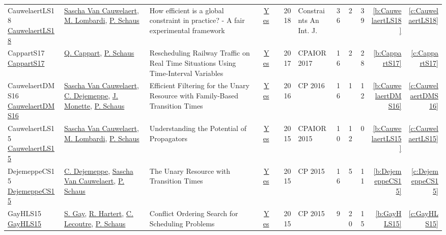{\begin{longtable}{>{\raggedright\arraybackslash}p{3cm}>{\raggedright\arraybackslash}p{6cm}>{\raggedright\arraybackslash}p{6.5cm}rrrp{2.5cm}rrrrr}
CauwelaertLS18 \href{https://doi.org/10.1007/s10601-017-9277-y}{CauwelaertLS18} & \hyperref[auth:a206]{Sascha Van Cauwelaert}, \hyperref[auth:a143]{M. Lombardi}, \hyperref[auth:a148]{P. Schaus} & How efficient is a global constraint in practice? - {A} fair experimental framework & \href{../works/CauwelaertLS18.pdf}{Yes} & \cite{CauwelaertLS18} & 2018 & Constraints An Int. J. & 36 & 2 & 39 & \ref{b:CauwelaertLS18} & \ref{c:CauwelaertLS18}\\
CappartS17 \href{https://doi.org/10.1007/978-3-319-59776-8_26}{CappartS17} & \hyperref[auth:a42]{Q. Cappart}, \hyperref[auth:a148]{P. Schaus} & Rescheduling Railway Traffic on Real Time Situations Using Time-Interval Variables & \href{../works/CappartS17.pdf}{Yes} & \cite{CappartS17} & 2017 & CPAIOR 2017 & 16 & 2 & 28 & \ref{b:CappartS17} & \ref{c:CappartS17}\\
CauwelaertDMS16 \href{https://doi.org/10.1007/978-3-319-44953-1_33}{CauwelaertDMS16} & \hyperref[auth:a206]{Sascha Van Cauwelaert}, \hyperref[auth:a207]{C. Dejemeppe}, \hyperref[auth:a150]{J. Monette}, \hyperref[auth:a148]{P. Schaus} & Efficient Filtering for the Unary Resource with Family-Based Transition Times & \href{../works/CauwelaertDMS16.pdf}{Yes} & \cite{CauwelaertDMS16} & 2016 & CP 2016 & 16 & 1 & 12 & \ref{b:CauwelaertDMS16} & \ref{c:CauwelaertDMS16}\\
CauwelaertLS15 \href{https://doi.org/10.1007/978-3-319-18008-3_29}{CauwelaertLS15} & \hyperref[auth:a206]{Sascha Van Cauwelaert}, \hyperref[auth:a143]{M. Lombardi}, \hyperref[auth:a148]{P. Schaus} & Understanding the Potential of Propagators & \href{../works/CauwelaertLS15.pdf}{Yes} & \cite{CauwelaertLS15} & 2015 & CPAIOR 2015 & 10 & 12 & 0 & \ref{b:CauwelaertLS15} & \ref{c:CauwelaertLS15}\\
DejemeppeCS15 \href{https://doi.org/10.1007/978-3-319-23219-5_7}{DejemeppeCS15} & \hyperref[auth:a207]{C. Dejemeppe}, \hyperref[auth:a206]{Sascha Van Cauwelaert}, \hyperref[auth:a148]{P. Schaus} & The Unary Resource with Transition Times & \href{../works/DejemeppeCS15.pdf}{Yes} & \cite{DejemeppeCS15} & 2015 & CP 2015 & 16 & 5 & 11 & \ref{b:DejemeppeCS15} & \ref{c:DejemeppeCS15}\\
GayHLS15 \href{https://doi.org/10.1007/978-3-319-23219-5_10}{GayHLS15} & \hyperref[auth:a216]{S. Gay}, \hyperref[auth:a217]{R. Hartert}, \hyperref[auth:a218]{C. Lecoutre}, \hyperref[auth:a148]{P. Schaus} & Conflict Ordering Search for Scheduling Problems & \href{../works/GayHLS15.pdf}{Yes} & \cite{GayHLS15} & 2015 & CP 2015 & 9 & 20 & 15 & \ref{b:GayHLS15} & \ref{c:GayHLS15}\\

\end{longtable}}
